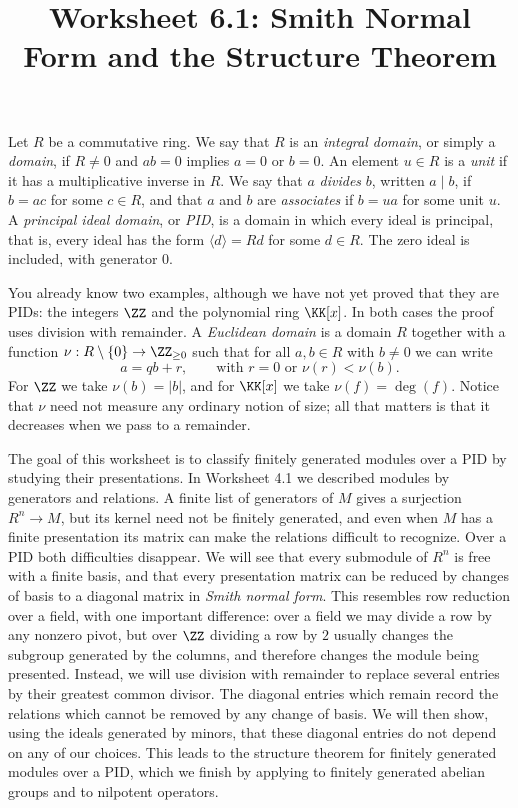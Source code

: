 \documentclass[12pt,reqno]{amsart}
\title{Worksheet 6.1: Smith Normal Form and the Structure Theorem}
\begin{document}
\maketitle
\thispagestyle{firstpage}

Let $R$ be a commutative ring. We say that $R$ is an \emph{integral domain}, or simply a \emph{domain}, if $R\ne0$ and $ab=0$ implies $a=0$ or $b=0$. An element $u\in R$ is a \emph{unit} if it has a multiplicative inverse in $R$. We say that $a$ \emph{divides} $b$, written $a\mid b$, if $b=ac$ for some $c\in R$, and that $a$ and $b$ are \emph{associates} if $b=ua$ for some unit $u$. A \emph{principal ideal domain}, or \emph{PID}, is a domain in which every ideal is principal, that is, every ideal has the form $\langle d\rangle=Rd$ for some $d\in R$. The zero ideal is included, with generator $0$.

You already know two examples, although we have not yet proved that they are PIDs: the integers $\ZZ$ and the polynomial ring $\KK[x]$. In both cases the proof uses division with remainder. A \emph{Euclidean domain} is a domain $R$ together with a function $\nu:R\setminus\{0\}\to\ZZ_{\geq0}$ such that for all $a,b\in R$ with $b\ne0$ we can write
\[
a=qb+r,\qquad\text{with }r=0\text{ or }\nu(r)<\nu(b).
\]
For $\ZZ$ we take $\nu(b)=|b|$, and for $\KK[x]$ we take $\nu(f)=\deg(f)$. Notice that $\nu$ need not measure any ordinary notion of size; all that matters is that it decreases when we pass to a remainder.

The goal of this worksheet is to classify finitely generated modules over a PID by studying their presentations. In Worksheet 4.1 we described modules by generators and relations. A finite list of generators of $M$ gives a surjection $R^n\to M$, but its kernel need not be finitely generated, and even when $M$ has a finite presentation its matrix can make the relations difficult to recognize. Over a PID both difficulties disappear. We will see that every submodule of $R^n$ is free with a finite basis, and that every presentation matrix can be reduced by changes of basis to a diagonal matrix in \emph{Smith normal form}. This resembles row reduction over a field, with one important difference: over a field we may divide a row by any nonzero pivot, but over $\ZZ$ dividing a row by $2$ usually changes the subgroup generated by the columns, and therefore changes the module being presented. Instead, we will use division with remainder to replace several entries by their greatest common divisor. The diagonal entries which remain record the relations which cannot be removed by any change of basis. We will then show, using the ideals generated by minors, that these diagonal entries do not depend on any of our choices. This leads to the structure theorem for finitely generated modules over a PID, which we finish by applying to finitely generated abelian groups and to nilpotent operators.
\end{document}
